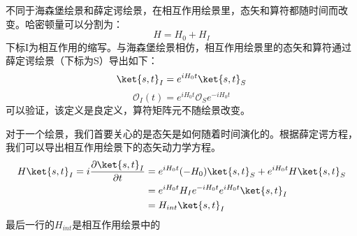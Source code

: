 \begin{definition}{}

不同于海森堡绘景和薛定谔绘景，在相互作用绘景里，态矢和算符都随时间而改变。哈密顿量可以分割为：
\begin{equation}
H=H_0+H_I
\end{equation}
下标I为相互作用的缩写。与海森堡绘景相仿，相互作用绘景里的态矢和算符通过薛定谔绘景（下标为S）导出如下：
\begin{equation}
\ket{s,t}_I=e^{iH_0 t}\ket{s,t}_S
\end{equation}
\begin{equation}
\mathcal O_I(t)=e^{iH_0 t}\mathcal O_Se^{-iH_0 t}
\end{equation}
可以验证，该定义是良定义，算符矩阵元不随绘景改变。
\end{definition}
对于一个绘景，我们首要关心的是态矢是如何随着时间演化的。根据薛定谔方程，我们可以导出相互作用绘景下的态矢动力学方程。
\begin{equation}
\begin{aligned}
H\ket{s,t}_I=i\frac{\partial\ket{s,t}_I}{\partial t}&= e^{iH_0 t}(-H_0)\ket{s,t}_S+e^{iH_0 t}H\ket{s,t}_S\\
&=e^{iH_0 t}H_Ie^{-iH_0 t}e^{iH_0 t}\ket{s,t}_I\\
&=H_{int}\ket{s,t}_I
\end{aligned}
\end{equation}
最后一行的$H_{int}$是相互作用绘景中的


